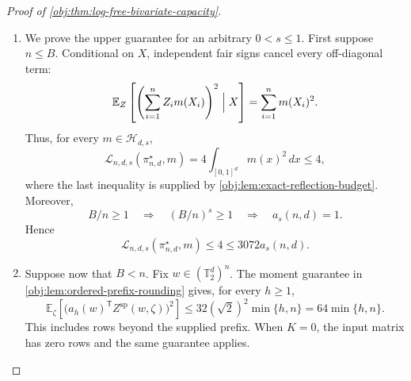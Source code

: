 \documentclass[11pt]{article}
\begin{document}
\begin{proof}[Proof of \cref{obj:thm:log-free-bivariate-capacity}]
\begin{enumerate}
For every fixed \(\mathbf x,\eta,T\), \cref{obj:lem:ordered-prefix-rounding}, applied with row bound \(\sqrt2\), gives
\[
\mathbb E_\zeta
Z_i^{\mathrm{sp}}(W(\mathbf x,\eta,T),\zeta)=0.
\]
Integration over \(\eta,T\), together with the independent-sign branch, yields
\[
\int_{\{-1,1\}^n}z_i\,\pi^\star_{n,d}(\mathbf x,dz)=0
\qquad(1\leq i\leq n)
\]
for every original sample. The feature evaluations, reflection lift, torus addition, and rounding output are Borel measurable; integrating their output against the probability seed law gives a Borel probability kernel. Drawing assignments from this covariate kernel gives
\[
Z\perp Y\mid X
\]
for every pre-assignment law allowed in \cref{obj:ass:assignment-independence}. Consequently,
\[
\pi^\star_{n,d}\in\mathcal D_{n,d,s}.
\]
Its branch choice, feature ordering, and seed distribution are independent of \(s\).

\item
We prove the upper guarantee for an arbitrary \(0<s\leq1\). First suppose \(n\leq B\). Conditional on \(X\), independent fair signs cancel every off-diagonal term:
\[
\mathbb E_Z\left[
\left(\sum_{i=1}^n Z_i m(X_i)\right)^2\Bigm|X
\right]
=
\sum_{i=1}^n m(X_i)^2.
\]
Thus, for every \(m\in\mathcal H_{d,s}\),
\[
\mathcal L_{n,d,s}(\pi^\star_{n,d},m)
=
4\int_{[0,1]^d}m(x)^2\,dx
\leq4,
\]
where the last inequality is supplied by \cref{obj:lem:exact-reflection-budget}.
Moreover,
\[
B/n\geq1
\quad\Longrightarrow\quad
(B/n)^s\geq1
\quad\Longrightarrow\quad
a_s(n,d)=1.
\]
Hence
\[
\mathcal L_{n,d,s}(\pi^\star_{n,d},m)
\leq4\leq3072a_s(n,d).
\]

\item
Suppose now that \(B<n\). Fix \(w\in(\mathbb T_2^d)^n\).
The moment guarantee in \cref{obj:lem:ordered-prefix-rounding} gives, for every \(h\geq1\),
\[
\mathbb E_\zeta
\left[
\bigl(a_h(w)^{\mathsf T}Z^{\mathrm{sp}}(w,\zeta)\bigr)^2
\right]
\leq32(\sqrt2)^2\min\{h,n\}
=
64\min\{h,n\}.
\]
This includes rows beyond the supplied prefix. When \(K=0\), the input matrix has zero rows and the same guarantee applies.


\end{enumerate}
\end{proof}
\end{document}
